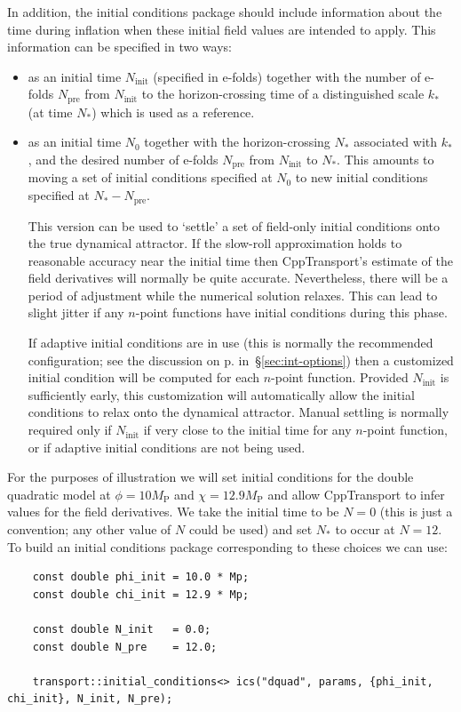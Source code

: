 \documentclass[11pt,a4paper]{article}
\newcommand{\Mp}{M_{\mathrm{P}}}
\newcommand{\Ninit}{N_{\text{init}}}
\newcommand{\Nstar}{N_{\ast}}
\newcommand{\Npre}{N_{\text{pre}}}
\newcommand{\Nzero}{N_{0}}
\newcommand{\kstar}{k_{\ast}}
\newcommand{\packagefont}{\sffamily}
\newcommand{\CppTransport}{{\packagefont CppTransport}}
\begin{document}
In addition, the initial conditions package
should include
information about the time during inflation when these
initial field values are intended to apply.
This information can be specified in two ways:
\begin{itemize}
	\item as an initial time $\Ninit$ (specified in e-folds)
	together with the number of e-folds $\Npre$ from
	$\Ninit$ to the horizon-crossing time of a distinguished
	scale $\kstar$ (at time $\Nstar$) which is used as a reference.
	
	\item as an initial time $\Nzero$
	together with the horizon-crossing $\Nstar$
	associated with $\kstar$,
	and the desired number of e-folds $\Npre$
	from $\Ninit$ to $\Nstar$.
	This amounts to moving a set of initial conditions specified
	at $\Nzero$ to new initial conditions specified at
	$\Nstar - \Npre$.
	
	This version can be used to `settle' a set of field-only
	initial conditions onto the true dynamical attractor.
	If the slow-roll approximation holds to reasonable accuracy
	near the initial time then {\CppTransport}'s estimate
	of the field derivatives will normally be quite accurate.
	Nevertheless, there will be a period of adjustment while the
	numerical solution relaxes.
	This can lead to slight jitter if any $n$-point functions
	have initial conditions during this phase.
	
	If adaptive initial conditions are in use
	(this is normally the recommended configuration; see
	the discussion on p.\pageref{enum:adpative-ics}
	in~\S\ref{sec:int-options})
	then a customized initial condition will be computed for
	each $n$-point function.
	Provided $\Ninit$ is sufficiently early, this customization
	will automatically allow the initial conditions to relax onto
	the dynamical attractor.
	Manual settling is normally required only if
	$\Ninit$ if very close to the initial time for
	any $n$-point function, or if adaptive initial conditions
	are not being used.
\end{itemize}
For the purposes of illustration we will
set initial conditions for the double quadratic model
at $\phi = 10 \Mp$ and $\chi = 12.9 \Mp$
and allow {\CppTransport} to infer
values for the field derivatives.
We take the initial time to be $N=0$
(this is just a convention; any other value of $N$ could be used)
and set $\Nstar$ to occur at $N=12$.
To build an initial conditions package corresponding to these choices
we can use:
\begin{verbatim}
    const double phi_init = 10.0 * Mp;
    const double chi_init = 12.9 * Mp;

    const double N_init   = 0.0;
    const double N_pre    = 12.0;

    transport::initial_conditions<> ics("dquad", params, {phi_init, chi_init}, N_init, N_pre);
\end{verbatim}
\end{document}
